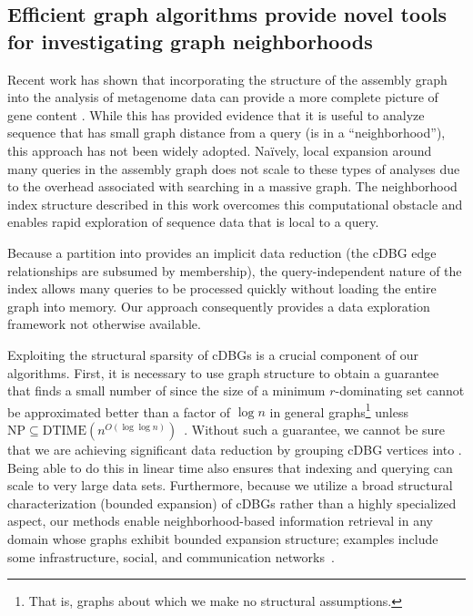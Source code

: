 \subsection*{Efficient graph algorithms provide novel tools for investigating graph neighborhoods}

Recent work has shown that incorporating the structure of the assembly graph into the analysis of metagenome
data can provide a more complete picture of gene content \cite{perchlorate,metacherchant}. While this has provided evidence that it is
useful to analyze sequence that has small graph distance from a query (is in a ``neighborhood''), this approach
has not been widely adopted.
Na\"ively, local expansion around many queries in the assembly graph does not scale to these types of analyses
due to the overhead associated with searching
in a massive graph. The neighborhood index structure described in this work overcomes this computational
obstacle and enables rapid exploration of sequence data that is local to a query.

Because a partition into \pieces provides an implicit data reduction (the cDBG edge relationships are subsumed by \piece membership), the query-independent nature of the index allows many queries to be processed quickly without loading the entire graph into memory.
Our approach consequently provides a data exploration framework not otherwise available.

Exploiting the structural sparsity of cDBGs is a crucial component of our
algorithms. First, it is necessary to use graph structure to obtain a guarantee
that  finds a small number of \pieces since the size
of a minimum $r$-dominating set cannot be approximated better than a factor of
$\log n$ in general graphs\footnote{That is, graphs about which we make no
structural assumptions.} unless $\text{NP}\subseteq \text{DTIME}(n^{O(\log \log
n)})$~\cite{chlebik2008approximation}. Without such a guarantee, we cannot be
sure that we are achieving significant data reduction by grouping cDBG vertices
into \pieces. Being able to do this in linear time also ensures that
indexing and querying can scale to very large data sets. Furthermore, because we
utilize a broad structural characterization (bounded expansion) of cDBGs rather than a
highly specialized aspect, our methods enable neighborhood-based
information retrieval in any domain whose graphs exhibit bounded expansion
structure; examples include some infrastructure,
social, and communication networks~\cite{demaine2014structural,felixThesis,wcol2018}.


